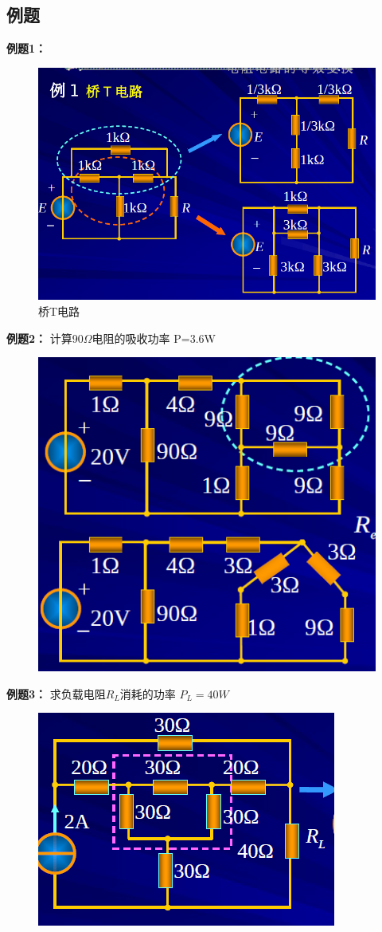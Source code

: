 \documentclass[11pt,a4paper,oneside]{book}
\begin{document}
\subsection{例题}
\noindent\textbf{例题1：}
\begin{figure}[H]
	\centering
	\includegraphics[width=0.7\linewidth]{screenshot008}
	\caption{桥T电路}
	\label{fig:screenshot008}
\end{figure}
\newpage
\noindent\textbf{例题2：}
计算90$\Omega$电阻的吸收功率 \quad P=3.6W
\begin{figure}[H]
	\centering
	\includegraphics[width=0.5\linewidth]{screenshot009}
	\caption{}
	\label{fig:screenshot009}
\end{figure}
\noindent\textbf{例题3：}
求负载电阻$R_L$消耗的功率 \quad $P_L=40W$
\begin{figure}[H]
	\centering
	\includegraphics[width=0.5\linewidth]{screenshot010}
	\caption{}
	\label{fig:screenshot010}
\end{figure}
\newpage
\end{document}
